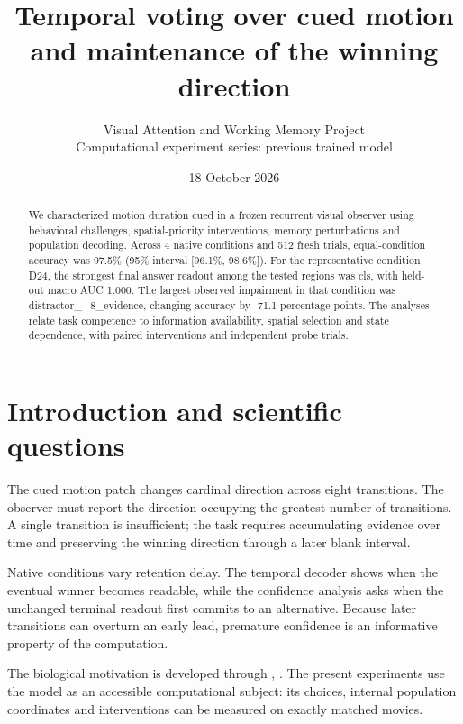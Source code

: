 \documentclass[11pt]{article}
\begin{document}
\title{\color{ink}Temporal voting over cued motion and maintenance of the winning direction}
\author{Visual Attention and Working Memory Project\\Computational experiment series: previous trained model}\date{18 October 2026}\maketitle
\begin{abstract}
We characterized motion duration cued in a frozen recurrent visual observer using behavioral challenges, spatial-priority interventions, memory perturbations and population decoding. Across 4 native conditions and 512 fresh trials, equal-condition accuracy was 97.5\% (95\% interval [96.1\%, 98.6\%]). For the representative condition D24, the strongest final answer readout among the tested regions was cls, with held-out macro AUC 1.000. The largest observed impairment in that condition was distractor\_\allowbreak{}+8\_\allowbreak{}evidence, changing accuracy by -71.1 percentage points. The analyses relate task competence to information availability, spatial selection and state dependence, with paired interventions and independent probe trials.
\end{abstract}
\section{Introduction and scientific questions}
The cued motion patch changes cardinal direction across eight transitions. The observer must report the direction occupying the greatest number of transitions. A single transition is insufficient; the task requires accumulating evidence over time and preserving the winning direction through a later blank interval.

Native conditions vary retention delay. The temporal decoder shows when the eventual winner becomes readable, while the confidence analysis asks when the unchanged terminal readout first commits to an alternative. Because later transitions can overturn an early lead, premature confidence is an informative property of the computation.

The biological motivation is developed through \cite{salzman}, \cite{spatial}. The present experiments use the model as an accessible computational subject: its choices, internal population coordinates and interventions can be measured on exactly matched movies.
\end{document}
